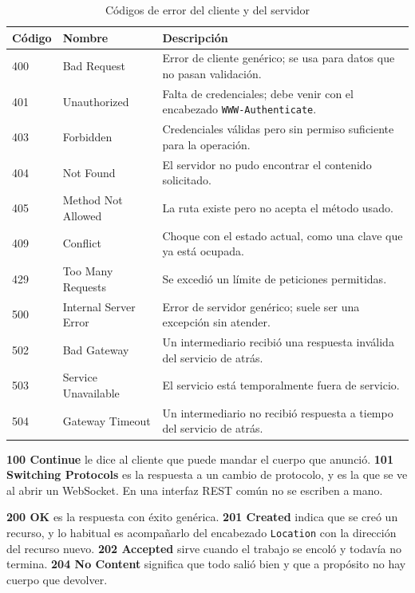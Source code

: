 \documentclass[10pt,a4paper]{article}
\begin{document}
\begin{table}[H]
	\centering
	\begin{tabular}{p{1.8cm} | p{4cm} | p{9.3cm}}\hline \hline
		\textbf{Código} & \textbf{Nombre} & \textbf{Descripción} \\ \hline \hline
		400 & Bad Request & Error de cliente genérico; se usa para datos que no pasan validación. \\ \hline
		401 & Unauthorized & Falta de credenciales; debe venir con el encabezado \texttt{WWW-Authenticate}. \\ \hline
		403 & Forbidden & Credenciales válidas pero sin permiso suficiente para la operación. \\ \hline
		404 & Not Found & El servidor no pudo encontrar el contenido solicitado. \\ \hline
		405 & Method Not Allowed & La ruta existe pero no acepta el método usado. \\ \hline
		409 & Conflict & Choque con el estado actual, como una clave que ya está ocupada. \\ \hline
		429 & Too Many Requests & Se excedió un límite de peticiones permitidas. \\ \hline
		500 & Internal Server Error & Error de servidor genérico; suele ser una excepción sin atender. \\ \hline
		502 & Bad Gateway & Un intermediario recibió una respuesta inválida del servicio de atrás. \\ \hline
		503 & Service Unavailable & El servicio está temporalmente fuera de servicio. \\ \hline
		504 & Gateway Timeout & Un intermediario no recibió respuesta a tiempo del servicio de atrás. \\ \hline \hline
	\end{tabular}
	\caption{Códigos de error del cliente y del servidor}
	\label{tabla:codigos-4xx-5xx}
\end{table}

\textbf{100 Continue} le dice al cliente que puede mandar el cuerpo que anunció. \textbf{101 Switching Protocols} es la respuesta a un cambio de protocolo, y es la que se ve al abrir un WebSocket. En una interfaz REST común no se escriben a mano.

\textbf{200 OK} es la respuesta con éxito genérica. \textbf{201 Created} indica que se creó un recurso, y lo habitual es acompañarlo del encabezado \texttt{Location} con la dirección del recurso nuevo. \textbf{202 Accepted} sirve cuando el trabajo se encoló y todavía no termina. \textbf{204 No Content} significa que todo salió bien y que a propósito no hay cuerpo que devolver.
\end{document}
